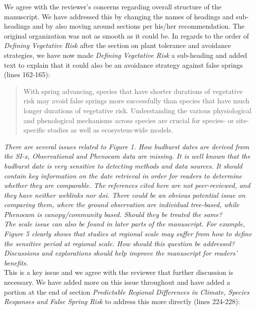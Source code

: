 \documentclass[11pt,a4paper]{article}
\begin{document}
We agree with the reviewer's concerns regarding overall structure of the manuscript. We have addressed this by changing the names of headings and sub-headings and by also moving around sections per his/her recommendation. The original organization was not as smooth as it could be. In regards to the order of \textit{Defining Vegetative Risk} after the section on plant tolerance and avoidance strategies, we have now made \textit{Defining Vegetative Risk} a sub-heading and added text to explain that it could also be an avoidance strategy against false springs (lines 162-165): \\

\begin{quote}
With spring advancing, species that have shorter durations of vegetative risk may avoid false springs more successfully than species that have much longer durations of vegetative risk. Understanding the various physiological and phenological mechanisms across species are crucial for species- or site-specific studies as well as ecosystem-wide models.
\end{quote}

\textit{There are several issues related to Figure 1. How budburst dates are derived from the SI-x, Observational and Phenocam data are missing. It is well known that the budburst date is very sensitive to detecting methods and data sources. It should contain key information on the date retrieval in order for readers to determine whether they are comparable. The references cited here are not peer-reviewed, and they have neither weblinks nor doi. There could be an obvious potential issue on comparing them, where the ground observation are individual tree-based, while Phenocam is canopy/community based. Should they be treated the same?} \\


\textit{The scale issue can also be found in later parts of the manuscript. For example, Figure 5 clearly shows that studies at regional scale may suffer from how to define the sensitive period at regional scale. How should this question be addressed? Discussions and explorations should help improve the manuscript for readers' benefits.} \\

This is a key issue and we agree with the reviewer that further discussion is necessary. We have added more on this issue throughout and have added a portion at the end of section \textit{Predictable Regional Differences in Climate, Species Responses and False Spring Risk} to address this more directly (lines 224-228):\\
\end{document}
